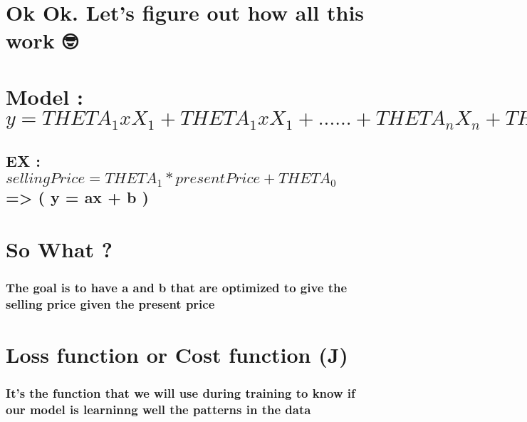 \documentclass[11pt]{article}
\begin{document}
    \section{Ok Ok. Let's figure out how all this work
🤓🧐👩🏿‍🔬👨🏿‍🔬}\label{ok-ok.-lets-figure-out-how-all-this-work}

    \section{\texorpdfstring{Model :
\(y = THETA_{1} x X_{1}+THETA_{1} x X_{1} +......+ THETA_{n}X_{n} +THETA_{0}\)}{Model : y = THETA\_\{1\} x X\_\{1\}+THETA\_\{1\} x X\_\{1\} +......+ THETA\_\{n\}X\_\{n\} +THETA\_\{0\}}}\label{model-y-theta_1-x-x_1theta_1-x-x_1-......-theta_nx_n-theta_0}

\subsection{\texorpdfstring{EX :
\(sellingPrice = THETA_{1} * presentPrice + THETA_{0}\) =\textgreater{}
( y = ax + b
)}{EX : sellingPrice = THETA\_\{1\} * presentPrice + THETA\_\{0\} =\textgreater{} ( y = ax + b )}}\label{ex-sellingprice-theta_1-presentprice-theta_0-y-ax-b}

    \section{So What ?}\label{so-what}

    \subsubsection{The goal is to have a and b that are optimized to give
the selling price given the present
price}\label{the-goal-is-to-have-a-and-b-that-are-optimized-to-give-the-selling-price-given-the-present-price}

    \section{Loss function or Cost function
(J)}\label{loss-function-or-cost-function-j}

\subsubsection{It's the function that we will use during training to
know if our model is learninng well the patterns in the
data}\label{its-the-function-that-we-will-use-during-training-to-know-if-our-model-is-learninng-well-the-patterns-in-the-data}
\end{document}
